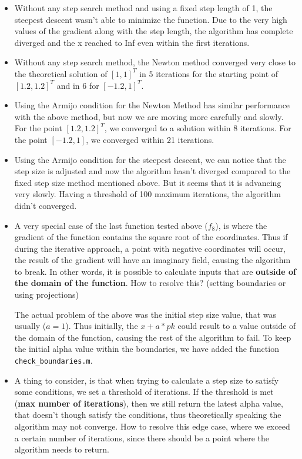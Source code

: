 \documentclass[a4paper,11pt]{article}
\numberwithin{equation}{section} %
\begin{document}
\begin{itemize}
    \item Without any step search method and using a fixed step length of 1, the steepest descent wasn't able to minimize the function. Due to the very high values of the gradient along with the step length, the algorithm has complete diverged and the x reached to Inf even within the first iterations.
    
    \item Without any step search method, the Newton method converged very close to the theoretical solution of $[1,1]^T$ in 5 iterations for the starting point of $[1.2,1.2]^T$ and in 6 for $[-1.2, 1]^T$.
    
    \item Using the Armijo condition for the Newton Method has similar performance with the above method, but now we are moving more carefully and slowly. For the point $[1.2,1.2]^T$, we converged to a solution within 8 iterations. For the point $[-1.2, 1]$, we converged within 21 iterations.
        
    \item Using the Armijo condition for the steepest descent, we can notice that the step size is adjusted and now the algorithm hasn't diverged compared to the fixed step size method mentioned above. But it seems that it is advancing very slowly. Having a threshold of 100 maximum iterations, the algorithm didn't converged.
    

    \item A very special case of the last function tested above ($f_8$), is where the gradient of the function contains the square root of the coordinates. Thus if during the iterative approach, a point with negative coordinates will occur, the result of the gradient will have an imaginary field, causing the algorithm to break. In other words, it is possible to calculate inputs that are \textbf{outside of the domain of the function}. How to resolve this? (setting boundaries or using projections)

    The actual problem of the above was the initial step size value, that was usually ($a=1$). Thus initially, the $x+a*pk$ could result to a value outside of the domain of the function, causing the rest of the algorithm to fail. To keep the initial alpha value within the boundaries, we have added the function \verb|check_boundaries.m|.

    \item A thing to consider, is that when trying to calculate a step size to satisfy some conditions, we set a threshold of iterations. If the threshold is met (\textbf{max number of iterations}), then we still return the latest alpha value, that doesn't though satisfy the conditions, thus theoretically speaking the algorithm may not converge. How to resolve this edge case, where we exceed a certain number of iterations, since there should be a point where the algorithm needs to return.


\end{itemize}
\end{document}
